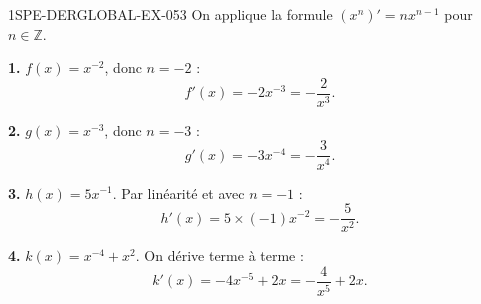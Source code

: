 \begin{corrige}{1SPE-DERGLOBAL-EX-053}
On applique la formule $(x^n)' = nx^{n-1}$ pour $n \in \mathbb{Z}$.

\textbf{1.} $f(x) = x^{-2}$, donc $n = -2$ :
\[
f'(x) = -2x^{-3} = -\frac{2}{x^3}.
\]

\textbf{2.} $g(x) = x^{-3}$, donc $n = -3$ :
\[
g'(x) = -3x^{-4} = -\frac{3}{x^4}.
\]

\textbf{3.} $h(x) = 5x^{-1}$. Par linéarité et avec $n = -1$ :
\[
h'(x) = 5 \times (-1) x^{-2} = -\frac{5}{x^2}.
\]

\textbf{4.} $k(x) = x^{-4} + x^2$. On dérive terme à terme :
\[
k'(x) = -4x^{-5} + 2x = -\frac{4}{x^5} + 2x.
\]
\end{corrige}
